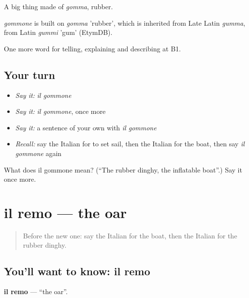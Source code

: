 A big thing made of \emph{gomma}, rubber.

\begin{cousinweb}
\emph{gommone} is built on \emph{gomma} 'rubber', which is inherited from Late Latin \emph{gumma}, from Latin \emph{gummi} 'gum' (EtymDB).
\end{cousinweb}

\begin{grammarlens}[title={What you've built}]
One more word for telling, explaining and describing at B1.
\end{grammarlens}

\subsection*{Your turn}
\begin{itemize}
\raggedright
  \item \emph{Say it:} \emph{il gommone}
  \item \emph{Say it:} \emph{il gommone}, once more
  \item \emph{Say it:} a sentence of your own with \emph{il gommone}
  \item \emph{Recall:} say the Italian for to set sail, then the Italian for the boat, then say \emph{il gommone} again
\end{itemize}

\begin{tcolorbox}[breakable,colback=teal!4,colframe=teal!35!black,title={Before you move on}]
What does il gommone mean? (\textquotedblleft{}The rubber dinghy, the inflatable boat\textquotedblright{}.) Say it once more.
\end{tcolorbox}
\section[il remo]{il remo — the oar}

\label{lesson:IT-C422-remo}



\begin{quote}
Before the new one: say the Italian for the boat, then the Italian for the rubber dinghy.
\end{quote}

\subsection*{You'll want to know: il remo}
\textbf{il remo} — \textquotedblleft{}the oar\textquotedblright{}.

